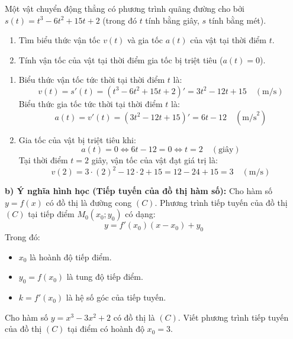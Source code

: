 \documentclass[12pt]{article}
\begin{document}
	\begin{vidu}[2]
		Một vật chuyển động thẳng có phương trình quãng đường cho bởi $s(t) = t^3 - 6t^2 + 15t + 2$ (trong đó $t$ tính bằng giây, $s$ tính bằng mét).
		\begin{enumerate}[label=\alph*)]
			\item Tìm biểu thức vận tốc $v(t)$ và gia tốc $a(t)$ của vật tại thời điểm $t$.
			\item Tính vận tốc của vật tại thời điểm gia tốc bị triệt tiêu ($a(t) = 0$).
		\end{enumerate}
	\end{vidu}
	
	\begin{loigiai}
		\begin{enumerate}[label=\alph*)]
			\item Biểu thức vận tốc tức thời tại thời điểm $t$ là:
			$$v(t) = s'(t) = (t^3 - 6t^2 + 15t + 2)' = 3t^2 - 12t + 15 \quad (\text{m/s})$$
			Biểu thức gia tốc tức thời tại thời điểm $t$ là:
			$$a(t) = v'(t) = (3t^2 - 12t + 15)' = 6t - 12 \quad (\text{m/s}^2)$$
			
			\item Gia tốc của vật bị triệt tiêu khi:
			$$a(t) = 0 \iff 6t - 12 = 0 \iff t = 2 \quad (\text{giây})$$
			Tại thời điểm $t = 2$ giây, vận tốc của vật đạt giá trị là:
			$$v(2) = 3 \cdot (2)^2 - 12 \cdot 2 + 15 = 12 - 24 + 15 = 3 \quad (\text{m/s})$$
		\end{enumerate}
	\end{loigiai}
	
	\textbf{b) Ý nghĩa hình học (Tiếp tuyến của đồ thị hàm số):}
	Cho hàm số $y = f(x)$ có đồ thị là đường cong $(C)$. Phương trình tiếp tuyến của đồ thị $(C)$ tại tiếp điểm $M_0(x_0; y_0)$ có dạng:
	$$y = f'(x_0)(x - x_0) + y_0$$
	Trong đó:
	\begin{itemize}
		\item $x_0$ là hoành độ tiếp điểm.
		\item $y_0 = f(x_0)$ là tung độ tiếp điểm.
		\item $k = f'(x_0)$ là hệ số góc của tiếp tuyến.
	\end{itemize}
	
	\begin{vidu}[3]
		Cho hàm số $y = x^3 - 3x^2 + 2$ có đồ thị là $(C)$. Viết phương trình tiếp tuyến của đồ thị $(C)$ tại điểm có hoành độ $x_0 = 3$.
	\end{vidu}
	
\end{document}
